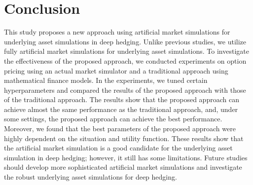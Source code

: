 \section{Conclusion}
This study proposes a new approach using artificial market simulations for underlying asset simulations in deep hedging.
Unlike previous studies, we utilize fully artificial market simulations for underlying asset simulations.
To investigate the effectiveness of the proposed approach, we conducted experiments on option pricing using an actual market simulator and a traditional approach using mathematical finance models.
In the experiments, we tuned certain hyperparameters and compared the results of the proposed approach with those of the traditional approach.
The results show that the proposed approach can achieve almost the same performance as the traditional approach, and, under some settings, the proposed approach can achieve the best performance.
Moreover, we found that the best parameters of the proposed approach were highly dependent on the situation and utility function.
These results show that the artificial market simulation is a good candidate for the underlying asset simulation in deep hedging; however, it still has some limitations.
Future studies should develop more sophisticated artificial market simulations and investigate the robust underlying asset simulations for deep hedging.






